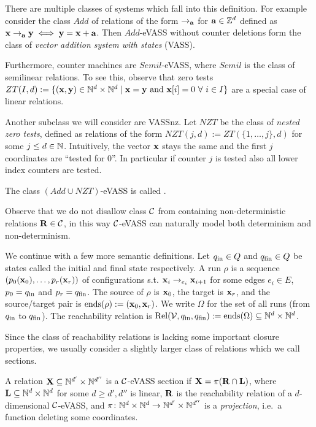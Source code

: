There are multiple classes of systems which fall into this definition. For example consider the class \(Add\) of relations of the form \(\to_{\mathbf{a}}\) for \(\mathbf{a} \in \mathbb{Z}^d\) defined as \(\mathbf{x} \to_{\mathbf{a}} \mathbf{y} \iff \mathbf{y}=\mathbf{x}+\mathbf{a}\). Then \(Add\)-eVASS without counter deletions form the class of \emph{vector addition system with states} (VASS).

Furthermore, counter machines are \(Semil\)-eVASS, where \(Semil\) is the class of semilinear relations. To see this, observe that zero tests \(ZT(I,d):=\{(\vect{x}, \vect{y}) \in \N^d \times \N^d \mid \vect{x}=\vect{y} \text{ and }\vect{x}[i]=0\ \forall\  i \in I\}\) are a special case of linear relations.

Another subclass we will consider are VASSnz. Let \(NZT\) be the class of \emph{nested zero tests}, defined as relations of the form \(NZT(j,d):=ZT(\{1,\dots, j\},d)\) for some \(j \leq d \in \mathbb{N}\). Intuitively, the vector \(\mathbf{x}\) stays the same and the first \(j\) coordinates are ``tested for \(0\)''. In particular if counter \(j\) is tested also all lower index counters are tested. 

The class \((Add \cup NZT)\)-eVASS is called \ConsideredModel.

Observe that we do not disallow class \(\mathcal{C}\) from containing non-deterministic relations \(\mathbf{R} \in \mathcal{C}\), in this way \(\mathcal{C}\)-eVASS can naturally model both determinism and non-determinism.

We continue with a few more semantic definitions. Let \(q_{\text{in}}\in Q\) and \(q_{\text{fin}}\in Q\) be states called the initial and final state respectively. A run \(\rho\) is a sequence \((p_0(\mathbf{x}_0), \dots, p_r(\mathbf{x}_r))\) of configurations s.t. \(\mathbf{x}_i \to_{e_i} \mathbf{x}_{i+1}\) for some edges \(e_i \in E\), \(p_0=q_{\text{in}}\) and \(p_r=q_{\text{fin}}\). The source of \(\rho\) is \(\mathbf{x}_0\), the target is \(\mathbf{x}_r\), and the source/target pair is \(\operatorname{ends}(\rho):=(\mathbf{x}_0, \mathbf{x}_r)\). We write \(\Omega\) for the set of all runs (from \(q_{\text{in}}\) to \(q_{\text{fin}}\)).  The reachability relation is \(\operatorname{Rel}(\operatorname{\mathcal{V}}, q_{\text{in}}, q_{\text{fin}}):=\operatorname{ends}(\Omega) \subseteq \mathbb{N}^d \times \mathbb{N}^d\).

Since the class of reachability relations is lacking some important closure properties, we usually consider a slightly larger class of relations which we call sections. 

\begin{definition}
A relation \(\mathbf{X} \subseteq \mathbb{N}^{d'} \times \mathbb{N}^{d''}\) is a \(\mathcal{C}\)-eVASS section if \(\mathbf{X}=\pi(\mathbf{R} \cap \mathbf{L})\), where \(\mathbf{L} \subseteq \mathbb{N}^d \times \mathbb{N}^d\) for some \(d \geq d', d''\) is linear, \(\mathbf{R}\) is the reachability relation of a \(d\)-dimensional  \(\mathcal{C}\)-eVASS, and \(\pi \colon \mathbb{N}^d \times \mathbb{N}^d \to \mathbb{N}^{d'} \times \mathbb{N}^{d''}\) is a \emph{projection}, i.e.\ a function deleting some coordinates.
\end{definition}



